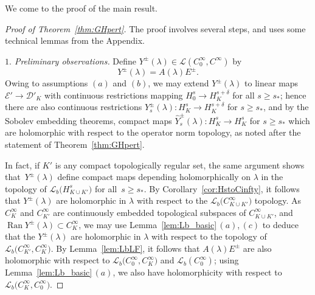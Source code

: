 \documentclass[pdftex]{sigma}
\numberwithin{equation}{section}
\newcommand{\DD}{{\mathscr D}}
\newcommand{\EE}{{\mathscr E}}
\newcommand{\LL}{{\mathcal L}}
\newcommand{\Ran}{\operatorname{Ran}}
\begin{document}
 We come to the proof of the main result.
 \begin{proof}[Proof of Theorem~\ref{thm:GHpert}] The proof involves several steps, and uses some technical lemmas from the Appendix.
 	
 	\emph{$1.$ Preliminary observations.} Define $Y^\pm(\lambda)\in\LL(C_0^\infty,C^\infty)$ by
 	\begin{equation*}
 		Y^\pm(\lambda)=A(\lambda)E^\pm.
 	\end{equation*}
 	Owing to assumptions $(a)$ and $(b)$, we may extend $Y^\pm(\lambda)$ to linear maps $\EE'\to\DD'_K$ with continuous restrictions mapping $H^s_0\to H^{s+\delta}_K$ for all $s\ge s_*$; hence there are also continuous restrictions $Y_s^\pm(\lambda)\colon H^s_K\to H^{s+\delta}_K$ for $s\ge s_*$,
 	and by the Sobolev embedding theorems, compact maps $\hat{Y}^\pm_s(\lambda)\colon H^s_K\to H^{s}_K$ for $s\ge s_*$ which are holomorphic with respect to the operator norm topology, as noted after the statement of Theorem~\ref{thm:GHpert}.
 	
 	In fact, if $K'$ is any compact topologically regular set, the same argument shows that~$Y^\pm(\lambda)$
 define compact maps depending holomorphically on $\lambda$ in the topology of
 	$\LL_b\big(H^s_{K\cup K'}\big)$ for all~${s\!\ge\!s_*}$. By Corollary~\ref{cor:HstoCinfty}, it follows that
 	$Y^\pm(\lambda)$ are holomorphic in $\lambda$ with respect to the $\LL_b\big(C^\infty_{K\cup K'}\big)$ topology.
 	As $C^\infty_K$ and $C^\infty_{K'}$ are continuously embedded topological subspaces of $C^\infty_{K\cup K'}$, and $\Ran Y^\pm(\lambda)\subset C^\infty_K$, we may use Lemma~\ref{lem:Lb_basic}\,$(a)$,\,$(c)$ to deduce that
 	the $Y^\pm(\lambda)$ are holomorphic in $\lambda$ with respect to the
 	topology of $\LL_b\big(C^\infty_{K'},C^\infty_{K}\big)$.
 	By Lemma~\ref{lem:LbLF}, it follows that
 	$A(\lambda)E^\pm$ are also holomorphic with respect to $\LL_b\big(C_0^\infty,C^\infty_K\big)$ and $\LL_b(C_0^\infty)$; using Lemma~\ref{lem:Lb_basic}\,$(a)$, we also have holomorphicity with respect to
 	$\LL_b\big(C^\infty_K,C_0^\infty\big)$.
 	

\end{proof}
\end{document}
